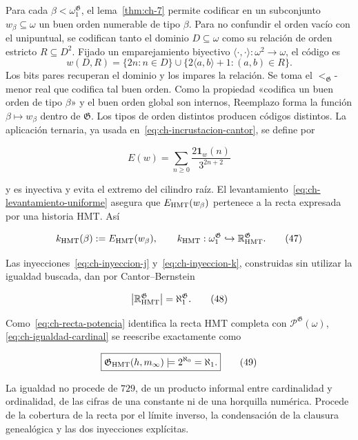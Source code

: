 Para cada \(\beta<\omega_1^{\mathfrak G}\), el lema~\ref{thm:ch-7} permite codificar en un
subconjunto \(w_\beta\subseteq\omega\) un buen orden numerable de tipo
\(\beta\). Para no confundir el orden vacío con el unipuntual, se codifican
tanto el dominio \(D\subseteq\omega\) como su relación de orden estricto
\(R\subseteq D^2\). Fijado un emparejamiento biyectivo
\(\langle\cdot,\cdot\rangle:\omega^2\to\omega\), el código es
\[
 w(D,R)=\{2n:n\in D\}\cup
        \{2\langle a,b\rangle+1:(a,b)\in R\}.
\]
Los bits pares recuperan el dominio y los impares la relación. Se toma el
\(<_{\mathfrak G}\)-menor real que codifica tal buen orden. Como la propiedad
«codifica un buen orden de tipo \(\beta\)» y el buen orden global son internos,
Reemplazo forma la función \(\beta\mapsto w_\beta\) dentro de
\(\mathfrak G\). Los tipos de orden distintos producen códigos distintos. La
aplicación ternaria, ya usada en~\eqref{eq:ch-incrustacion-cantor}, se define por

\[
 E(w)=\sum_{n\ge0}\frac{2\mathbf1_w(n)}{3^{2n+2}}
\tag{46}\label{eq:ch-incrustacion-ternaria}
\]

y es inyectiva y evita el extremo del cilindro raíz. El levantamiento~\eqref{eq:ch-levantamiento-uniforme}
asegura que \(E_{\rm HMT}(w_\beta)\) pertenece a la recta expresada por una
historia HMT. Así

\[
 k_{\rm HMT}(\beta):=E_{\rm HMT}(w_\beta),
 \qquad
 k_{\rm HMT}:\omega_1^{\mathfrak G}
 \hookrightarrow\mathbb R_{\rm HMT}^{\mathfrak G}.
\tag{47}\label{eq:ch-inyeccion-k}
\]

Las inyecciones~\eqref{eq:ch-inyeccion-j} y~\eqref{eq:ch-inyeccion-k}, construidas sin utilizar la igualdad buscada,
dan por Cantor--Bernstein

\[
 \bigl|\mathbb R_{\rm HMT}^{\mathfrak G}\bigr|
 =\aleph_1^{\mathfrak G}.
\tag{48}\label{eq:ch-igualdad-cardinal}
\]

Como~\eqref{eq:ch-recta-potencia} identifica la recta HMT completa con
\(\mathcal P^{\mathfrak G}(\omega)\), \eqref{eq:ch-igualdad-cardinal} se reescribe exactamente como

\[
 \boxed{
  \mathfrak G_{\rm HMT}(h,m_\infty)
  \models 2^{\aleph_0}=\aleph_1.}
\tag{49}\label{eq:ch-decision}
\]

La igualdad no procede de \(729\), de un producto informal entre cardinalidad
y ordinalidad, de las cifras de una constante ni de una horquilla numérica.
Procede de la cobertura de la recta por el límite inverso, la condensación de
la clausura genealógica y las dos inyecciones explícitas.

